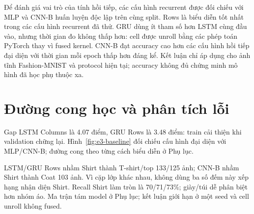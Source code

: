 Để đánh giá vai trò của tính hồi tiếp, các cấu hình recurrent được đối chiếu
với MLP và CNN-B huấn luyện độc lập trên cùng split.
Rows là biểu diễn tốt nhất trong các cấu hình recurrent đã thử. GRU dùng ít
tham số hơn LSTM cùng đầu vào, nhưng thời gian đo không thấp hơn: cell được
unroll bằng các phép toán PyTorch thay vì fused kernel. CNN-B đạt accuracy
cao hơn các cấu hình hồi tiếp đại diện với thời gian mỗi epoch thấp hơn đáng kể.
Kết luận chỉ áp dụng cho ảnh tĩnh Fashion-MNIST và protocol hiện tại;
accuracy không đủ chứng minh mô hình đã học phụ thuộc xa.

\section{Đường cong học và phân tích lỗi}

Gap LSTM Columns là 4.07 điểm, GRU Rows là 3.48 điểm: train cải thiện
khi validation chững lại. Hình~\ref{fig:e3-baseline} đối chiếu cấu hình đại diện
với MLP/CNN-B; đường cong theo từng cách biểu diễn ở Phụ lục.

LSTM/GRU Rows nhầm Shirt thành T-shirt/top 133/125 ảnh; CNN-B nhầm Shirt
thành Coat 103 ảnh. Vì cặp lớp khác nhau, không dùng ba số đếm này xếp hạng
nhận diện Shirt. Recall Shirt làm tròn là 70/71/73\%; giày/túi dễ phân biệt
hơn nhóm áo. Ma trận tám model ở Phụ lục; kết luận giới hạn ở một seed và
cell unroll không fused.



